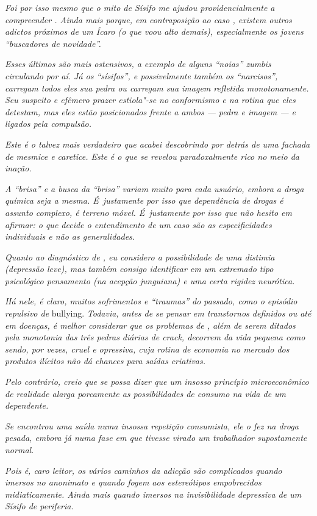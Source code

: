 
\emph{Foi por isso mesmo que o mito de Sísifo me ajudou
providencialmente a compreender . Ainda mais porque, em contraposição
ao caso , existem outros adictos próximos de um Ícaro (o que voou alto
demais), especialmente os jovens ``buscadores de novidade''.}

\emph{Esses últimos são mais ostensivos, a exemplo de alguns ``noias''
zumbis circulando por aí. Já os ``sísifos'', e possivelmente também os
``narcisos'', carregam todos eles sua pedra ou carregam sua imagem
refletida monotonamente. Seu suspeito e efêmero prazer estiola"-se no
conformismo e na rotina que eles detestam, mas eles estão posicionados
frente a ambos --- pedra e imagem --- e ligados pela compulsão.}

\emph{Este é o  talvez mais verdadeiro que acabei descobrindo por
detrás de uma fachada de mesmice e caretice. Este é o  que se revelou
paradoxalmente rico no meio da inação.}

\emph{A ``brisa'' e a busca da ``brisa'' variam muito para cada usuário,
embora a droga química seja a mesma. É~justamente por isso que
dependência de drogas é assunto complexo, é terreno móvel. É~justamente
por isso que não hesito em afirmar: o que decide o entendimento de
um caso são as especificidades individuais e não as generalidades.}

\emph{Quanto ao diagnóstico de , eu considero a possibilidade de uma
distimia (depressão leve), mas também consigo identificar em  um
extremado tipo psicológico pensamento (na acepção junguiana) e uma certa
rigidez neurótica.}

\emph{Há nele, é claro, muitos sofrimentos e ``traumas'' do passado,
como o episódio repulsivo de} bullying. \emph{Todavia, antes de se pensar em
transtornos definidos ou até em doenças, é melhor considerar que os
problemas de , além de serem ditados pela monotonia das três pedras
diárias de crack, decorrem da vida pequena como sendo, por vezes, cruel
e opressiva, cuja rotina de economia no mercado dos produtos ilícitos
não dá chances para saídas criativas.}

\emph{Pelo contrário, creio que se possa dizer que um insosso princípio
microeconômico de realidade alarga porcamente as possibilidades de
consumo na vida de um dependente.}

\emph{Se  encontrou uma saída numa insossa repetição consumista, ele o
fez na droga pesada, embora já numa fase em que tivesse virado um
trabalhador supostamente normal.}

\emph{Pois é, caro leitor, os vários caminhos da adicção são complicados
quando imersos no anonimato e quando fogem aos estereótipos empobrecidos
midiaticamente. Ainda mais quando imersos na invisibilidade depressiva
de um Sísifo de periferia.}
